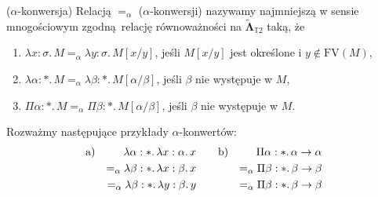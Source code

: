   \begin{definicja}(\(\alpha\)-konwersja) 
    Relacją \(=_{\alpha}\) (\(\alpha\)-konwersji) nazywamy najmniejszą w sensie mnogościowym zgodną relację równoważności na \(\mathbf{\tilde\Lambda}_{\mathbb{T}2}\) taką, że
    \begin{enumerate}[label=(\(\alpha\)\arabic*), ref=(\(\alpha\)\arabic*)]
      \setlength\itemsep{0em}
      \item \(\lambda x:\sigma.\,M =_\alpha \lambda y:\sigma.\,M[x/y]\), jeśli \(M[x/y]\) jest określone i \(y\not\in \mathrm{FV}(M)\),
      \item \(\lambda \alpha:*.\,M =_\alpha \lambda \beta:*.\,M[\alpha/\beta]\), jeśli \(\beta\) nie występuje w \(M\),
      \item \(\Pi \alpha:*.\,M =_\alpha \Pi \beta:*.\,M[\alpha/\beta]\), jeśli \(\beta\) nie występuje w \(M\).
    \end{enumerate}
  \end{definicja}

\begin{przyklad} Rozważmy następujące przykłady \(\alpha\)-konwertów:
  \begin{align*}
    \begin{aligned}
    \text{a)}\quad \\ \null\\ \null\\
    \end{aligned}
    \begin{aligned}
      \lambda \alpha:*.\,\lambda x:\alpha.\,x\\
      =_\alpha \lambda \beta:*.\,\lambda x:\beta.\, x \\
      =_\alpha\lambda \beta:*.\,\lambda y:\beta.\, y
    \end{aligned} &\quad & 
    \begin{aligned}
    \text{b)}\quad \\ \null\\ \null\\
    \end{aligned}
    \begin{aligned}
      \Pi \alpha:*.\,\alpha\to\alpha\\
      =_\alpha \Pi\beta:*.\,\beta\to\beta\\ 
      =_\alpha\Pi\beta:*.\,\beta\to\beta
    \end{aligned}
  \end{align*}
\end{przyklad}

